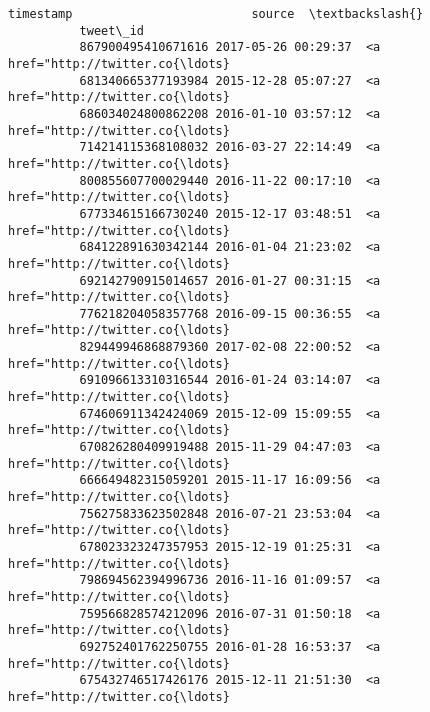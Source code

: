 \documentclass[11pt]{article}
\begin{document}
\begin{Verbatim}[commandchars=\\\{\}]
                                       timestamp                         source  \textbackslash{}
          tweet\_id                                                                
          867900495410671616 2017-05-26 00:29:37  <a href="http://twitter.co{\ldots}   
          681340665377193984 2015-12-28 05:07:27  <a href="http://twitter.co{\ldots}   
          686034024800862208 2016-01-10 03:57:12  <a href="http://twitter.co{\ldots}   
          714214115368108032 2016-03-27 22:14:49  <a href="http://twitter.co{\ldots}   
          800855607700029440 2016-11-22 00:17:10  <a href="http://twitter.co{\ldots}   
          677334615166730240 2015-12-17 03:48:51  <a href="http://twitter.co{\ldots}   
          684122891630342144 2016-01-04 21:23:02  <a href="http://twitter.co{\ldots}   
          692142790915014657 2016-01-27 00:31:15  <a href="http://twitter.co{\ldots}   
          776218204058357768 2016-09-15 00:36:55  <a href="http://twitter.co{\ldots}   
          829449946868879360 2017-02-08 22:00:52  <a href="http://twitter.co{\ldots}   
          691096613310316544 2016-01-24 03:14:07  <a href="http://twitter.co{\ldots}   
          674606911342424069 2015-12-09 15:09:55  <a href="http://twitter.co{\ldots}   
          670826280409919488 2015-11-29 04:47:03  <a href="http://twitter.co{\ldots}   
          666649482315059201 2015-11-17 16:09:56  <a href="http://twitter.co{\ldots}   
          756275833623502848 2016-07-21 23:53:04  <a href="http://twitter.co{\ldots}   
          678023323247357953 2015-12-19 01:25:31  <a href="http://twitter.co{\ldots}   
          798694562394996736 2016-11-16 01:09:57  <a href="http://twitter.co{\ldots}   
          759566828574212096 2016-07-31 01:50:18  <a href="http://twitter.co{\ldots}   
          692752401762250755 2016-01-28 16:53:37  <a href="http://twitter.co{\ldots}   
          675432746517426176 2015-12-11 21:51:30  <a href="http://twitter.co{\ldots}   
          

\end{Verbatim}
\end{document}
